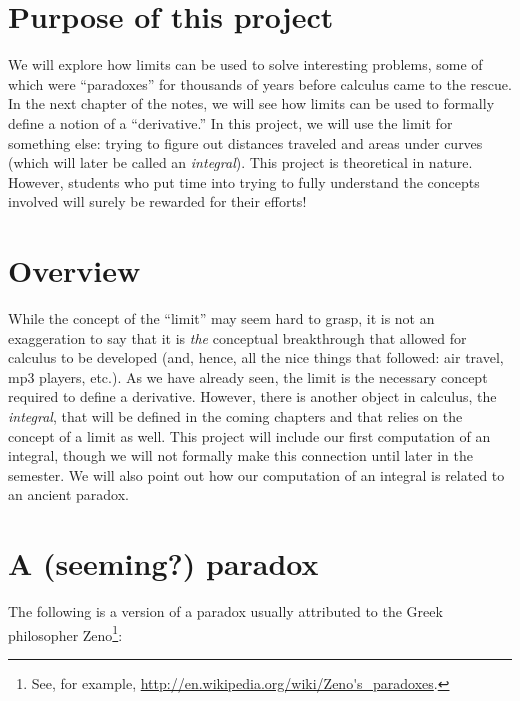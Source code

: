 
\section{Purpose of this project}

We will explore how limits can be used to solve interesting problems,
some of which were ``paradoxes'' for thousands of years before
calculus came to the rescue.  In the next chapter of the notes, we
will see how limits can be used to formally define a notion of a
``derivative.''  In this project, we will use the limit for something
else: trying to figure out distances traveled and areas under curves
(which will later be called an \textit{integral}).  This project is
theoretical in nature.  However, students who put time into trying to
fully understand the concepts involved will surely be rewarded for
their efforts!

\section{Overview}

While the concept of the ``limit'' may seem hard to grasp, it is not
an exaggeration to say that it is \textit{the} conceptual breakthrough
that allowed for calculus to be developed (and, hence, all the nice
things that followed: air travel, mp3 players, etc.).  As we have
already seen, the limit is the necessary concept required to define a
derivative.  However, there is another object in calculus, the
\textit{integral}, that will be defined in the coming chapters and
that relies on the concept of a limit as well.  This project will
include our first computation of an integral, though we will not
formally make this connection until later in the semester.  We will
also point out how our computation of an integral is related to an
ancient paradox.

\section{A (seeming?) paradox}

The following is a version of a paradox usually attributed to the
Greek philosopher Zeno\footnote{See, for example,
  \url{http://en.wikipedia.org/wiki/Zeno's_paradoxes}.}: \vspace{.1in}

